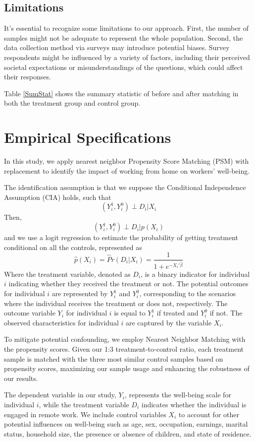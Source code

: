 \documentclass[12pt]{article}
\begin{document}
\subsection{Limitations}
It's essential to recognize some limitations to our approach. First, the number of samples might not be adequate to represent the whole population. Second, the data collection method via surveys may introduce potential biases. Survey respondents might be influenced by a variety of factors, including their perceived societal expectations or misunderstandings of the questions, which could affect their responses.

Table \ref{SumStat} shows the summary statistic of before and after matching in both the treatment group and control group.

\section{Empirical Specifications}\label{em_strategy}

In this study, we apply nearest neighbor Propensity Score Matching (PSM) with replacement to identify the impact of working from home on workers' well-being.

The identification assumption is that we suppose the Conditional Independence Assumption (CIA) holds, such that 
$$
(Y_i^1, Y_i^0) \perp D_i|X_i
$$
Then, 
$$
(Y_i^1, Y_i^0) \perp D_i|p(X_i)
$$
and we use a logit regression to estimate the probability of getting treatment conditional on all the controls, represented as 
$$
\hat p(X_i) = \hat Pr(D_i| X_i) = \frac{1}{1+e^{-X_i'\hat\beta}}
$$
Where the treatment variable, denoted as $D_i$, is a binary indicator for individual $i$ indicating whether they received the treatment or not. The potential outcomes for individual $i$ are represented by $Y_i^1$ and $Y_i^0$, corresponding to the scenarios where the individual receives the treatment or does not, respectively. The outcome variable $Y_i$ for individual $i$ is equal to $Y_i^1$ if treated and $Y_i^0$ if not. The observed characteristics for individual $i$ are captured by the variable $X_i$.

To mitigate potential confounding, we employ Nearest Neighbor Matching with the propensity scores. Given our 1:3 treatment-to-control ratio, each treatment sample is matched with the three most similar control samples based on propensity scores, maximizing our sample usage and enhancing the robustness of our results.

The dependent variable in our study, $Y_i$, represents the well-being scale for individual $i$, while the treatment variable $D_i$ indicates whether the individual is engaged in remote work. We include control variables $X_i$ to account for other potential influences on well-being such as age, sex, occupation, earnings, marital status, household size, the presence or absence of children, and state of residence.
\end{document}
